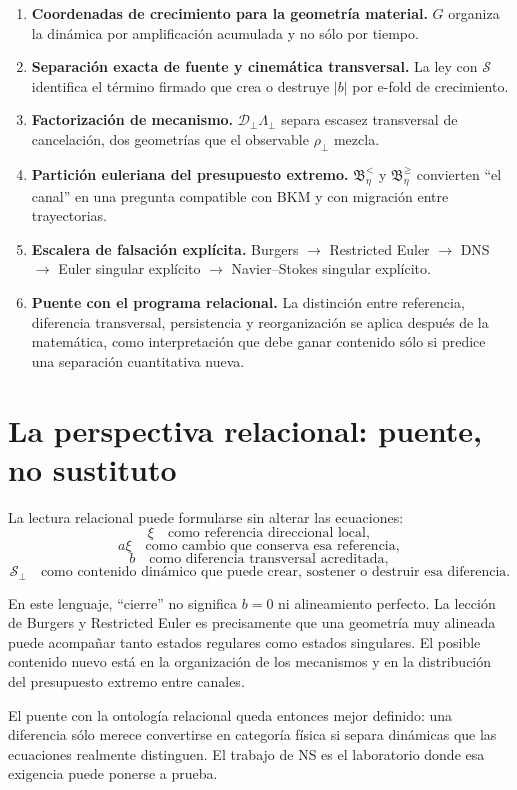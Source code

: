 \documentclass[11pt]{article}
\newcommand{\rhoT}{\rho_{\perp}}
\newcommand{\Scal}{\mathcal S}
\newcommand{\Dcal}{\mathcal D_{\perp}}
\newcommand{\Lcal}{\Lambda_{\perp}}
\begin{document}
\begin{enumerate}[leftmargin=1.7em]
\item \textbf{Coordenadas de crecimiento para la geometría material.} $G$ organiza la dinámica por amplificación acumulada y no sólo por tiempo.
\item \textbf{Separación exacta de fuente y cinemática transversal.} La ley con $\Scal$ identifica el término firmado que crea o destruye $|b|$ por e-fold de crecimiento.
\item \textbf{Factorización de mecanismo.} $\Dcal\Lcal$ separa escasez transversal de cancelación, dos geometrías que el observable $\rhoT$ mezcla.
\item \textbf{Partición euleriana del presupuesto extremo.} $\mathfrak B_\eta^{<}$ y $\mathfrak B_\eta^{\ge}$ convierten ``el canal'' en una pregunta compatible con BKM y con migración entre trayectorias.
\item \textbf{Escalera de falsación explícita.} Burgers $\rightarrow$ Restricted Euler $\rightarrow$ DNS $\rightarrow$ Euler singular explícito $\rightarrow$ Navier--Stokes singular explícito.
\item \textbf{Puente con el programa relacional.} La distinción entre referencia, diferencia transversal, persistencia y reorganización se aplica después de la matemática, como interpretación que debe ganar contenido sólo si predice una separación cuantitativa nueva.
\end{enumerate}

\section{La perspectiva relacional: puente, no sustituto}

La lectura relacional puede formularse sin alterar las ecuaciones:
\[
\xi\quad\text{como referencia direccional local},
\]
\[
a\xi\quad\text{como cambio que conserva esa referencia},
\]
\[
b\quad\text{como diferencia transversal acreditada},
\]
\[
\Scal_\perp\quad\text{como contenido dinámico que puede crear, sostener o destruir esa diferencia}.
\]

En este lenguaje, ``cierre'' no significa $b=0$ ni alineamiento perfecto. La lección de Burgers y Restricted Euler es precisamente que una geometría muy alineada puede acompañar tanto estados regulares como estados singulares. El posible contenido nuevo está en la organización de los mecanismos y en la distribución del presupuesto extremo entre canales.

El puente con la ontología relacional queda entonces mejor definido: una diferencia sólo merece convertirse en categoría física si separa dinámicas que las ecuaciones realmente distinguen. El trabajo de NS es el laboratorio donde esa exigencia puede ponerse a prueba.
\end{document}
